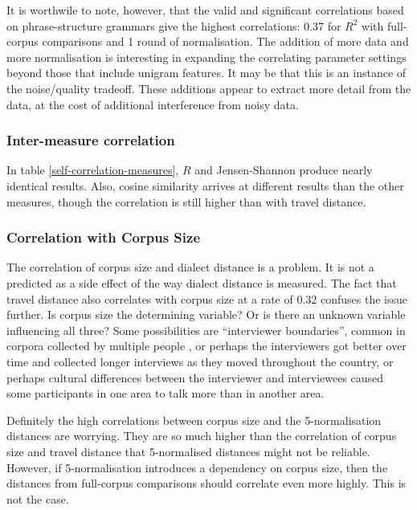 It is worthwile to note, however, that the valid and significant
correlations based on phrase-structure grammars give the highest
correlations: 0.37 for $R^2$ with full-corpus comparisons and 1 round
of normalisation.
The addition of more data and more normalisation is interesting in
expanding the correlating parameter settings beyond those that include
unigram features. It may be that this is an instance of the noise/quality tradeoff.
These additions appear to extract more detail from
the data, at the cost of additional interference from noisy data.


\subsubsection{Inter-measure correlation}

In table \ref{self-correlation-measures}, $R$ and Jensen-Shannon
produce nearly identical results. Also, cosine similarity arrives
at different results than the other measures, though the correlation
is still higher than with travel distance.

\subsubsection{Correlation with Corpus Size}

The correlation of corpus size and dialect distance is a problem. It
is not a predicted as a side effect of the way dialect distance is
measured. The fact that travel distance also correlates with corpus
size at a rate of 0.32 confuses the issue further. Is corpus size the
determining variable? Or is there an unknown variable influencing all
three? Some possibilities are ``interviewer boundaries'', common in
corpora collected by multiple people \cite{chambers98}, or perhaps the
interviewers got better over time and collected longer interviews as
they moved throughout the country, or perhaps cultural differences
between the interviewer and interviewees caused some participants in
one area to talk more than in another area.

Definitely the high correlations between corpus size and the
5-normalisation distances are worrying. They are so much higher than
the correlation of corpus size and travel distance that 5-normalised
distances might not be reliable.
However, if 5-normalisation introduces a dependency on corpus size,
then the distances from full-corpus comparisons should correlate even
more highly. This is not the case.

